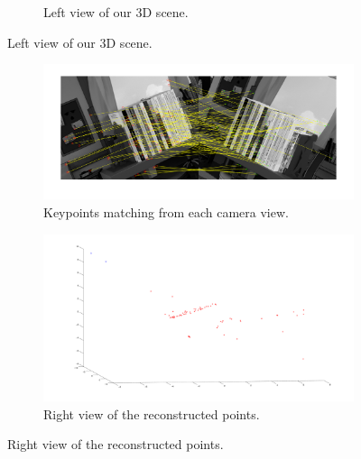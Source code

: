 \documentclass[12pt]{article}
\begin{document}
\begin{figure}[htbp]
\begin{subfigure}[b]{0.35\textwidth}
                \caption{Left view of our 3D scene.}
                \label{fig:blender2}
        \end{subfigure}
\end{figure}

\begin{figure}[htbp]
		\ContinuedFloat
		\centering
        \begin{subfigure}[b]{0.49\textwidth}
                \includegraphics[width=\textwidth]{images/reconstructionMatching}
                \caption{Keypoints matching from each camera view.}
                \label{fig:stereoMatching}
        \end{subfigure}
        \begin{subfigure}[b]{0.49\textwidth}
                \includegraphics[width=\textwidth]{images/reconstruction1}
                \caption{Right view of the reconstructed points.}
                \label{fig:stereoRecons1}
        \end{subfigure}
\end{figure}
\end{document}

